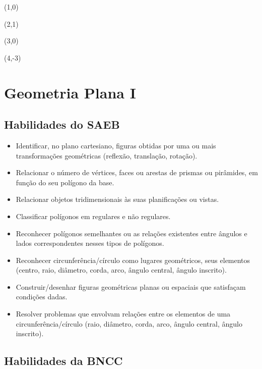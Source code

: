 \begin{escolha}

\item (1,0)

\item (2,1)

\item (3,0)

\item (4,-3)

\end{escolha}

\chapter{Geometria Plana I}

\section{Habilidades do SAEB}

\begin{itemize}
  \item Identificar, no plano cartesiano, figuras obtidas por uma ou mais
transformações geométricas (reflexão, translação, rotação).
  \item Relacionar o número de vértices, faces ou arestas de prismas ou
pirâmides, em função do seu polígono da base.
  \item Relacionar objetos tridimensionais às suas planificações ou vistas.
  \item Classificar polígonos em regulares e não regulares.
  \item Reconhecer polígonos semelhantes ou as relações existentes entre
ângulos e lados correspondentes nesses tipos de polígonos.
  \item Reconhecer circunferência/círculo como lugares geométricos, seus
elementos (centro, raio, diâmetro, corda, arco, ângulo central, ângulo
inscrito).
  \item Construir/desenhar figuras geométricas planas ou espaciais que
satisfaçam condições dadas.
  \item Resolver problemas que envolvam relações entre os elementos de uma
circunferência/círculo (raio, diâmetro, corda, arco, ângulo central, ângulo
inscrito).
\end{itemize} 

\section*{Habilidades da BNCC}


